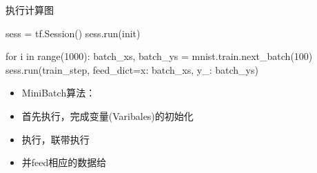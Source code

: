 \begin{frame}[fragile]{执行计算图}
\begin{python}
sess = tf.Session()
sess.run(init)

for i in range(1000):
  batch_xs, batch_ys = mnist.train.next_batch(100)
  sess.run(train_step, feed_dict={x: batch_xs, y_: batch_ys})
\end{python}

\begin{itemize}
  \item MiniBatch算法：
  \item 首先执行，完成变量(Varibales)的初始化
  \item 执行，联带执行
  \item 并feed相应的数据给
\end{itemize}

\end{frame}